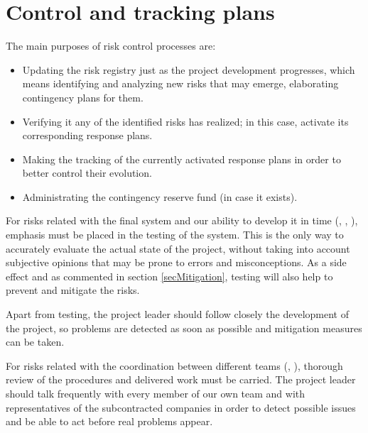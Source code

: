 \section{Control and tracking plans}

The main purposes of risk control processes are:
\begin{itemize} 
\item Updating the risk registry just as the project development progresses, which means identifying and analyzing new risks that may emerge, elaborating contingency plans for them.
\item Verifying it any of the identified risks has realized; in this case, activate its corresponding response plans.
\item Making the tracking of the currently activated response plans in order to better control their evolution.
\item Administrating the contingency reserve fund (in case it exists). 
\end{itemize}

For risks related with the final system and our ability to develop it in time (, , ), emphasis must be placed in the testing of the system. This is the only way to accurately evaluate the actual state of the project, without taking into account subjective opinions that may be prone to errors and misconceptions. As a side effect and as commented in section \ref{secMitigation}, testing will also help to prevent and mitigate the risks.

Apart from testing, the project leader should follow closely the development of the project, so problems are detected as soon as possible and mitigation measures can be taken.

For risks related with the coordination between different teams (, ), thorough review of the procedures and delivered work must be carried. The project leader should talk frequently with every member of our own team and with representatives of the subcontracted companies in order to detect possible issues and be able to act before real problems appear.
